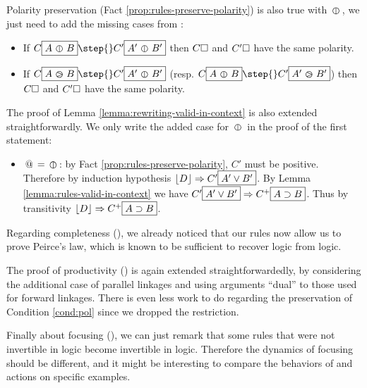Polarity preservation (Fact \ref{prop:rules-preserve-polarity}) is also true
with $\operatorname{\,\varobar\,}$, we just need to add the missing cases from :
\begin{itemize}
  \item If $C\select{A \para B} \step{} C'\select{A' \para B'}$ then $C\square$ and
  $C'\square$ have the same polarity.
  \item If $C\select{A \back B} \step{} C'\select{A' \para B'}$ (resp. $C\select{A
  \para B} \step{} C'\select{A' \back B'}$) then $C\square$ and $C'\square$ have the
  same polarity.
\end{itemize}
The proof of Lemma \ref{lemma:rewriting-valid-in-context} is also extended
straightforwardly. We only write the added case for $\operatorname{\,\varobar\,}$ in the proof of the
first statement:
\begin{itemize}
  \item $\operatorname{\,@\,} = \operatorname{\,\varobar\,}$: by Fact \ref{prop:rules-preserve-polarity}, $C'$ must
  be positive. Therefore by induction hypothesis $\lfloor D\rfloor \Rightarrow C'\fbox{$A'
  \lor B'$}$. By Lemma \ref{lemma:rules-valid-in-context} we have
  $C'\fbox{$A' \lor B'$} \Rightarrow C^+\fbox{$A \supset B$}$. Thus by transitivity
  $\lfloor D\rfloor \Rightarrow C^+\fbox{$A \supset B$}$.
\end{itemize}

Regarding completeness (), we already noticed that our
rules now allow us to prove Peirce's law, which is known to be sufficient to
recover  logic from  logic.

The proof of productivity () is again extended
straightforwardedly, by considering the additional case of parallel linkages and
using arguments ``dual'' to those used for forward linkages. There is even less
work to do regarding the preservation of Condition \ref{cond:pol} since we
dropped the  restriction.

Finally about focusing (), we can just remark that some rules
that were not invertible in  logic become invertible in 
logic. Therefore the dynamics of focusing should be different, and it might be
interesting to compare the behaviors of  and   actions
on specific examples.